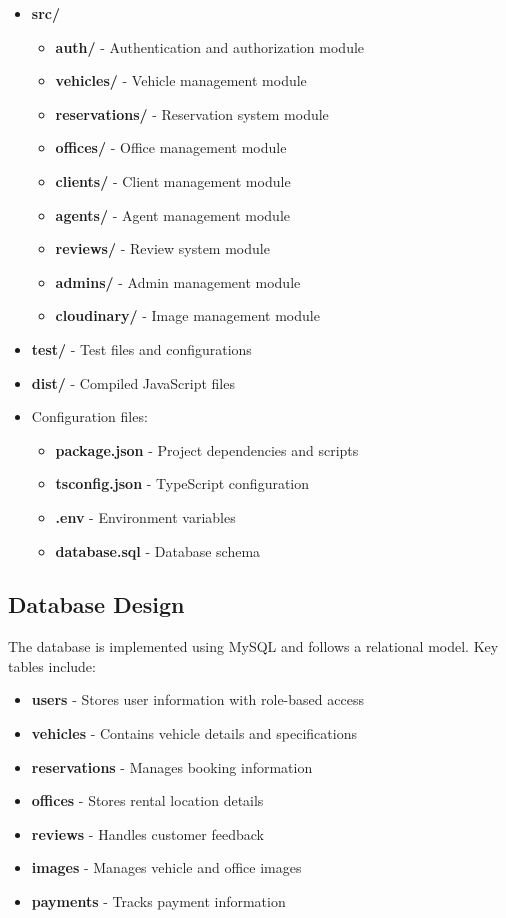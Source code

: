 \begin{itemize}
    \item \textbf{src/}
    \begin{itemize}
        \item \textbf{auth/} - Authentication and authorization module
        \item \textbf{vehicles/} - Vehicle management module
        \item \textbf{reservations/} - Reservation system module
        \item \textbf{offices/} - Office management module
        \item \textbf{clients/} - Client management module
        \item \textbf{agents/} - Agent management module
        \item \textbf{reviews/} - Review system module
        \item \textbf{admins/} - Admin management module
        \item \textbf{cloudinary/} - Image management module
    \end{itemize}
    
    \item \textbf{test/} - Test files and configurations
    \item \textbf{dist/} - Compiled JavaScript files
    \item Configuration files:
    \begin{itemize}
        \item \textbf{package.json} - Project dependencies and scripts
        \item \textbf{tsconfig.json} - TypeScript configuration
        \item \textbf{.env} - Environment variables
        \item \textbf{database.sql} - Database schema
    \end{itemize}
\end{itemize}

\subsection{Database Design}
The database is implemented using MySQL and follows a relational model. Key tables include:

\begin{itemize}
    \item \textbf{users} - Stores user information with role-based access
    \item \textbf{vehicles} - Contains vehicle details and specifications
    \item \textbf{reservations} - Manages booking information
    \item \textbf{offices} - Stores rental location details
    \item \textbf{reviews} - Handles customer feedback
    \item \textbf{images} - Manages vehicle and office images
    \item \textbf{payments} - Tracks payment information
\end{itemize}

